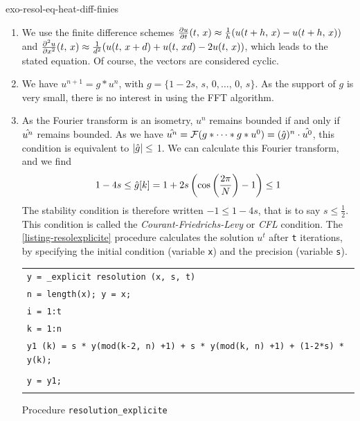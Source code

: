  
\begin{correction}{exo-resol-eq-heat-diff-finies}
\begin{enumerate}
\item We use the finite difference schemes $ \frac{ \partial u}{\partial t} (t, \, x) \approx \frac{1}{h} (u (t + h, \, x) -u (t + h, \, x)) $ and $ \frac{ \partial^2 u}{\partial x^2} (t, \, x) \approx \frac{1}{d^2} (u (t, \, x + d) + u (t, \, xd) -2 u (t, \, x)) $, which leads to the stated equation. Of course, the vectors are considered cyclic.
\item We have $ u^{n+1} = g * u^{n} $, with $ g = \{1-2s, \, s, \, 0, \ldots, \, 0, \, s\} $. As the support of $ g $ is very small, there is no interest in using the FFT algorithm.
\item {} As the Fourier transform is an isometry, $ u^{n} $ remains bounded if and only if $ \hat{u^{n}} $ remains bounded. As we have $ \hat{u^{n}} = \mathcal{F}(g * \cdots * g * u^{0}) = (\hat{g})^n \cdot \hat{u^{0}} $, this condition is equivalent to $ | \hat{g} | \leq $ 1. We can calculate this Fourier transform, and we find
\begin{equation*}
1 - 4 s \leq \hat{g}[k] = 1 + 2s \left(\cos \left(\frac{2 \pi}{N} \right)-1 \right) \leq 1
\end{equation*}
The stability condition is therefore written $ -1 \leq 1 - 4 s $, that is to say $ s \leq \frac{1}{2} $. This condition is called the \textit{Courant-Friedrichs-Levy} or \textit{CFL} condition. The \Matlab{} \ref{listing-resolexplicite} procedure calculates the solution $ u^{t} $ after \texttt{t} iterations, by specifying the initial condition (variable \texttt{x}) and the precision (variable \texttt{s}).

\begin{listing} 
\begin{footnotesize} 
{\upshape
\begin{tabular}{l} \texttt{\pfunction y = \_explicit resolution (x, s, t)} \\
\texttt{n = length(x); y = x;} \\
\texttt{\pfor i = 1:t} \\
\quad \texttt{\pfor k = 1:n} \\
\quad \quad \texttt{y1 (k) = s * y(mod(k-2, n) +1) + s * y(mod(k, n) +1) + (1-2*s) * y(k);} \\
\quad \texttt{\pend} \\
\quad \texttt{y = y1;} \\
\texttt{\pend} \\
\end{tabular}
}
\end{footnotesize}
\caption{Procedure \texttt{\upshape resolution\_explicite}}
\label{listing-resolexplicite}
\end{listing}
 

\end{enumerate}
\end{correction}
